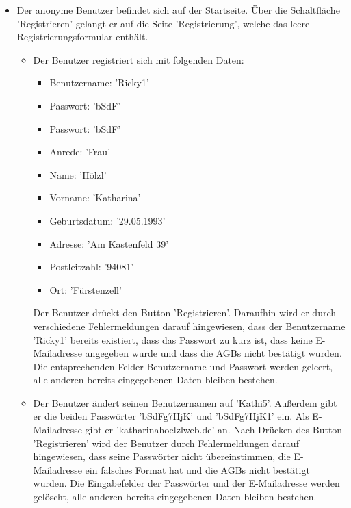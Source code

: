 \documentclass[a4paper]{scrreprt}
\begin{document}
\begin{itemize}
					
				\item {} 
				 Der anonyme Benutzer befindet sich auf der Startseite. Über die Schaltfläche 'Registrieren' gelangt er auf die Seite 'Registrierung', welche das leere Registrierungsformular enthält. 		
					\begin{itemize}
						\item Der Benutzer registriert sich mit folgenden Daten: 
							\begin{itemize}
								\item Benutzername: 'Ricky1'
								\item Passwort: 'bSdF'
								\item Passwort: 'bSdF'
								\item Anrede: 'Frau'
								\item Name: 'Hölzl'
								\item Vorname: 'Katharina'
								\item Geburtsdatum: '29.05.1993'
								\item Adresse: 'Am Kastenfeld 39'
								\item Postleitzahl: '94081'
								\item Ort: 'Fürstenzell'
							\end{itemize}
						Der Benutzer drückt den Button 'Registrieren'. Daraufhin wird er durch verschiedene Fehlermeldungen darauf hingewiesen, dass der Benutzername 'Ricky1' bereits existiert, dass das Passwort zu kurz ist, dass keine E-Mailadresse angegeben wurde und dass die AGBs nicht bestätigt wurden. Die entsprechenden Felder Benutzername und Passwort werden geleert, alle anderen bereits eingegebenen Daten bleiben bestehen.
						
						\item Der Benutzer ändert seinen Benutzernamen auf 'Kathi5'. Außerdem gibt er die beiden Passwörter 'bSdFg7HjK' und 'bSdFg7HjK1' ein. Als E-Mailadresse gibt er 'katharinahoelzlweb.de' an. Nach Drücken des Button 'Registrieren' wird der Benutzer durch Fehlermeldungen darauf hingewiesen, dass seine Passwörter nicht übereinstimmen, die E-Mailadresse ein falsches Format hat und die AGBs nicht bestätigt wurden. Die Eingabefelder der Passwörter und der E-Mailadresse werden gelöscht, alle anderen bereits eingegebenen Daten bleiben bestehen.
						

\end{itemize}
\end{itemize}
\end{document}
